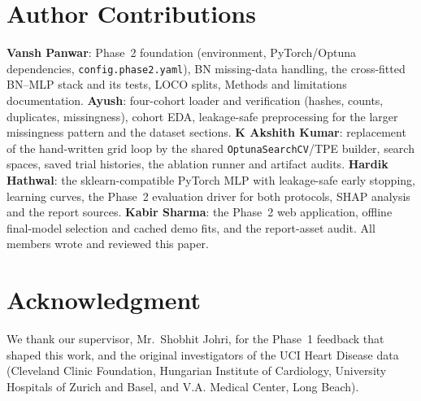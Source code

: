 \documentclass[conference]{IEEEtran}
\newcommand{\code}[1]{\texttt{\small #1}}
\begin{document}
\section*{Author Contributions}
\textbf{Vansh Panwar}: Phase~2 foundation (environment, PyTorch/Optuna dependencies, \code{config.phase2.yaml}), BN missing-data handling, the cross-fitted BN--MLP stack and its tests, LOCO splits, Methods and limitations documentation. \textbf{Ayush}: four-cohort loader and verification (hashes, counts, duplicates, missingness), cohort EDA, leakage-safe preprocessing for the larger missingness pattern and the dataset sections. \textbf{K Akshith Kumar}: replacement of the hand-written grid loop by the shared \code{OptunaSearchCV}/TPE builder, search spaces, saved trial histories, the ablation runner and artifact audits. \textbf{Hardik Hathwal}: the sklearn-compatible PyTorch MLP with leakage-safe early stopping, learning curves, the Phase~2 evaluation driver for both protocols, SHAP analysis and the report sources. \textbf{Kabir Sharma}: the Phase~2 web application, offline final-model selection and cached demo fits, and the report-asset audit. All members wrote and reviewed this paper.

\section*{Acknowledgment}
We thank our supervisor, Mr.\ Shobhit Johri, for the Phase~1 feedback that shaped this work, and the original investigators of the UCI Heart Disease data (Cleveland Clinic Foundation, Hungarian Institute of Cardiology, University Hospitals of Zurich and Basel, and V.A. Medical Center, Long Beach).



\end{document}
